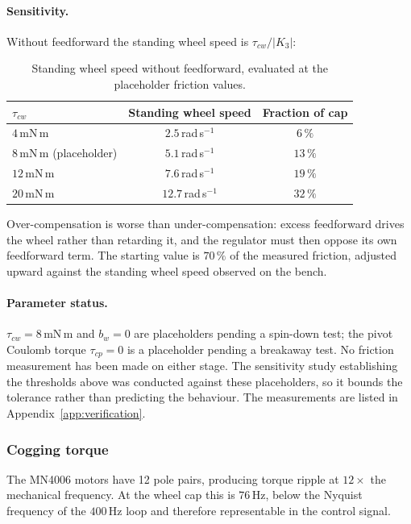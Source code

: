 \paragraph{Sensitivity.} Without feedforward the standing wheel speed is
$\tau_{cw}/|K_3|$:

\begin{table}[htbp]
\centering
\small
\begin{tabular}{@{}lcc@{}}
\toprule
$\tau_{cw}$ & Standing wheel speed & Fraction of cap\\
\midrule
$4$\,mN\,m & $2.5$\,rad\,s$^{-1}$ & $6\,\%$\\
$8$\,mN\,m (placeholder) & $5.1$\,rad\,s$^{-1}$ & $13\,\%$\\
$12$\,mN\,m & $7.6$\,rad\,s$^{-1}$ & $19\,\%$\\
$20$\,mN\,m & $12.7$\,rad\,s$^{-1}$ & $32\,\%$\\
\bottomrule
\end{tabular}
\caption{Standing wheel speed without feedforward, evaluated at the
placeholder friction values.}
\label{tab:friction-cost}
\end{table}

Over-compensation is worse than under-compensation: excess feedforward drives
the wheel rather than retarding it, and the regulator must then oppose its own
feedforward term. The starting value is $70\,\%$ of the measured friction,
adjusted upward against the standing wheel speed observed on the bench.

\paragraph{Parameter status.} $\tau_{cw} = 8$\,mN\,m and $b_w = 0$ are
placeholders pending a spin-down test; the pivot Coulomb torque
$\tau_{cp} = 0$ is a placeholder pending a breakaway test. No friction
measurement has been made on either stage. The sensitivity study establishing
the thresholds above was conducted against these placeholders, so it bounds
the tolerance rather than predicting the behaviour. The measurements are
listed in Appendix~\ref{app:verification}.

\subsubsection{Cogging torque}
\label{sec:cogging}

The MN4006 motors have 12 pole pairs, producing torque ripple at $12\times$
the mechanical frequency. At the wheel cap this is $76$\,Hz, below the
Nyquist frequency of the $400$\,Hz loop and therefore representable in the
control signal.

